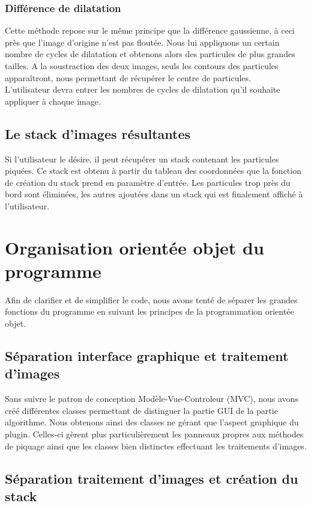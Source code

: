 \subsubsection{Différence de dilatation}
Cette méthode repose sur le même principe que la différence gaussienne, à ceci près que l'image d'origine n'est pas floutée. Nous lui appliquons un certain nombre de cycles de dilatation et obtenons alors des particules de plus grandes tailles. A la soustraction des deux images, seuls les contours des particules apparaîtront, nous permettant de récupérer le centre de particules.\\
L'utilisateur devra entrer les nombres de cycles de dilatation qu'il souhaite appliquer à chaque image.

\subsection{Le stack d'images résultantes}

Si l'utilisateur le désire, il peut récupérer un stack contenant les particules piquées. Ce stack est obtenu à partir du tableau des coordonnées que la fonction de création du stack prend en paramètre d'entrée.
Les particules trop près du bord sont éliminées, les autres ajoutées dans un stack qui est finalement affiché à l'utilisateur.

\section{Organisation orientée objet du programme}

Afin de clarifier et de simplifier le code, nous avons tenté de séparer les grandes fonctions du programme en suivant les principes de la programmation orientée objet.

\subsection*{Séparation interface graphique et traitement d'images}

Sans suivre le patron de conception Modèle-Vue-Controleur (MVC), nous avons créé différentes classes permettant de distinguer la partie GUI de la partie algorithme. Nous obtenons ainsi des classes ne gérant que l'aspect graphique du plugin. Celles-ci gèrent plus particulièrement les panneaux propres aux méthodes de piquage ainsi que les classes bien distinctes effectuant les traitements d'images.

\subsection*{Séparation traitement d'images et création du stack}

